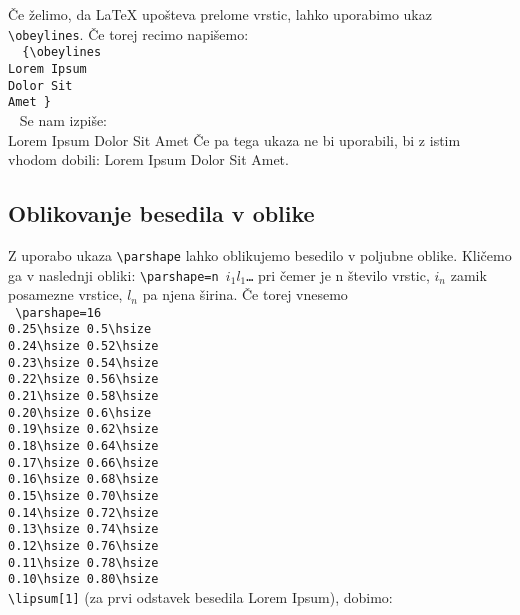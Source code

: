 \documentclass[a4paper]{book}
\newcommand\tbs{\textbackslash{}}
\begin{document}
Če želimo, da \LaTeX{} upošteva prelome vrstic, lahko uporabimo ukaz \texttt{\tbs{}obeylines}.
Če torej recimo napišemo:
\\
\texttt{
{\obeylines\parindent=0pt
\{\tbs{}obeylines \\
Lorem Ipsum \\
Dolor Sit \\
Amet
\}\\
}
}
\noindent{} Se nam izpiše:
\\
{\obeylines\parindent=0pt
Lorem Ipsum
Dolor Sit
Amet
} Če pa tega ukaza ne bi uporabili, bi z istim vhodom dobili:
Lorem Ipsum
Dolor Sit
Amet.

\subsection{Oblikovanje besedila v oblike}

Z uporabo ukaza \texttt{\tbs{}parshape} lahko oblikujemo besedilo v poljubne oblike. Kličemo ga v naslednji obliki: \texttt{\tbs{}parshape=n $i_1 l_1$\ldots} pri čemer je n število vrstic, $i_n$ zamik posamezne vrstice, $l_n$ pa njena širina.
Če torej vnesemo\\
\texttt{
\tbs{}parshape=16 \\
0.25\tbs{}hsize 0.5\tbs{}hsize \\
0.24\tbs{}hsize 0.52\tbs{}hsize \\
0.23\tbs{}hsize 0.54\tbs{}hsize \\
0.22\tbs{}hsize 0.56\tbs{}hsize \\
0.21\tbs{}hsize 0.58\tbs{}hsize \\
0.20\tbs{}hsize 0.6\tbs{}hsize \\
0.19\tbs{}hsize 0.62\tbs{}hsize \\
0.18\tbs{}hsize 0.64\tbs{}hsize \\
0.17\tbs{}hsize 0.66\tbs{}hsize \\
0.16\tbs{}hsize 0.68\tbs{}hsize \\
0.15\tbs{}hsize 0.70\tbs{}hsize \\
0.14\tbs{}hsize 0.72\tbs{}hsize \\
0.13\tbs{}hsize 0.74\tbs{}hsize \\
0.12\tbs{}hsize 0.76\tbs{}hsize \\
0.11\tbs{}hsize 0.78\tbs{}hsize \\
0.10\tbs{}hsize 0.80\tbs{}hsize \\
\tbs{}lipsum[1]} (za prvi odstavek besedila Lorem Ipsum), dobimo:\\
\end{document}
